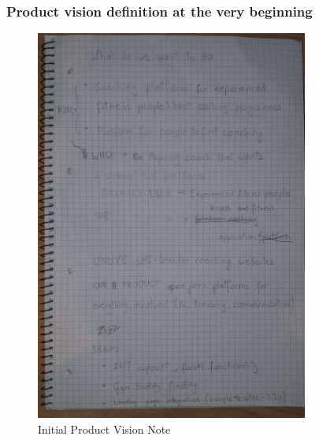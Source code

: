 \subsubsection{Product vision definition at the very beginning}

\begin{figure}[H]
  \centering
  \includegraphics[width=0.8\textwidth]{images/vision_note.jpg}
  \caption{Initial Product Vision Note}
  \label{fig:visionNote}
\end{figure}

